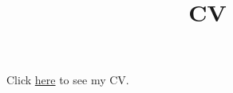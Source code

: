 \documentclass[
  letterpaper,
  DIV=11,
  numbers=noendperiod]{scrartcl}
\title{CV}
\author{}
\date{}
\begin{document}
\maketitle


Click \href{CV_CastellarGranados_August25.pdf}{here} to see my CV.
\end{document}

